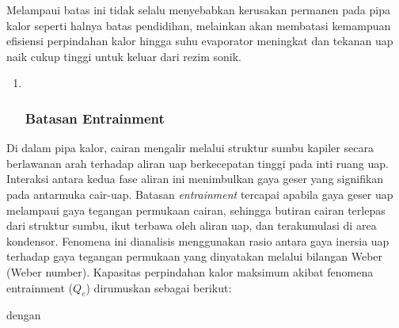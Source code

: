 \documentclass[
]{article}
\begin{document}
Melampaui batas ini tidak selalu menyebabkan kerusakan permanen pada
pipa kalor seperti halnya batas pendidihan, melainkan akan membatasi
kemampuan efisiensi perpindahan kalor hingga suhu evaporator meningkat
dan tekanan uap naik cukup tinggi untuk keluar dari rezim sonik.

\begin{enumerate}
\def\labelenumi{\arabic{enumi}.}
\setcounter{enumi}{2}
\item ~
  \subsubsection{\texorpdfstring{\textbf{Batasan
  Entrainment}}{Batasan Entrainment}}\label{batasan-entrainment}
\end{enumerate}

Di dalam pipa kalor, cairan mengalir melalui struktur sumbu kapiler
secara berlawanan arah terhadap aliran uap berkecepatan tinggi pada inti
ruang uap. Interaksi antara kedua fase aliran ini menimbulkan gaya geser
yang signifikan pada antarmuka cair-uap. Batasan \emph{entrainment}
tercapai apabila gaya geser uap melampaui gaya tegangan permukaan
cairan, sehingga butiran cairan terlepas dari struktur sumbu, ikut
terbawa oleh aliran uap, dan terakumulasi di area kondensor. Fenomena
ini dianalisis menggunakan rasio antara gaya inersia uap terhadap gaya
tegangan permukaan yang dinyatakan melalui bilangan Weber (Weber
number). Kapasitas perpindahan kalor maksimum akibat fenomena
entrainment (\({Q}_{e}\)) dirumuskan sebagai berikut:

\href{https://saxarona.github.io/mathjax-viewer/?input=Q_e\%3DA_vh_\%7Bfg\%7D\%5Cleft\%5B\%5Cfrac\%7B\%5Csigma\%7B\%7D\%5Crho_v\%7D\%7B2r_h\%7D\%5Cright\%5D\%5E\%7B0.5\%7D\#0}{}

dengan
\end{document}
